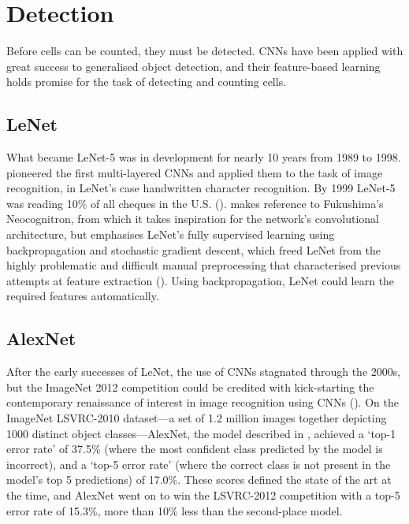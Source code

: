 \section{Detection}
Before cells can be counted, they must be detected. CNNs have been applied with great success to generalised object detection, and their feature-based learning holds promise for the task of detecting and counting cells.\\

\subsection{LeNet}
What became LeNet-5 was in development for nearly 10 years from 1989 to 1998. \cite{LeCun-1989} pioneered the first multi-layered CNNs and applied them to the task of image recognition, in LeNet’s case handwritten character recognition. By 1999 LeNet-5 was reading 10\% of all cheques in the U.S. (\cite{LeCun-et-al-2015}). \cite{LeCun-1989} makes reference to Fukushima’s Neocognitron, from which it takes inspiration for the network's convolutional architecture, but emphasises LeNet’s fully supervised learning using backpropagation and stochastic gradient descent, which freed LeNet from the highly problematic and difficult manual preprocessing that characterised previous attempts at feature extraction (\cite{LeCun-1989,8016501}). Using backpropagation, LeNet could learn the required features automatically.

\subsection{AlexNet}
After the early successes of LeNet, the use of CNNs stagnated through the 2000s, but the ImageNet 2012 competition could be credited with kick-starting the contemporary renaissance of interest in image recognition using CNNs (\cite{LeCun-et-al-2015}). On the ImageNet LSVRC-2010 dataset—a set of 1.2 million images together depicting 1000 distinct object classes—AlexNet, the model described in \cite{Krizhevsky-2012}, achieved a ‘top-1 error rate’ of 37.5\% (where the most confident class predicted by the model is incorrect), and a ‘top-5 error rate’ (where the correct class is not present in the model’s top 5 predictions) of 17.0\%. These scores defined the state of the art at the time, and AlexNet went on to win the LSVRC-2012 competition with a top-5 error rate of 15.3\%, more than 10\% less than the second-place model.\\

